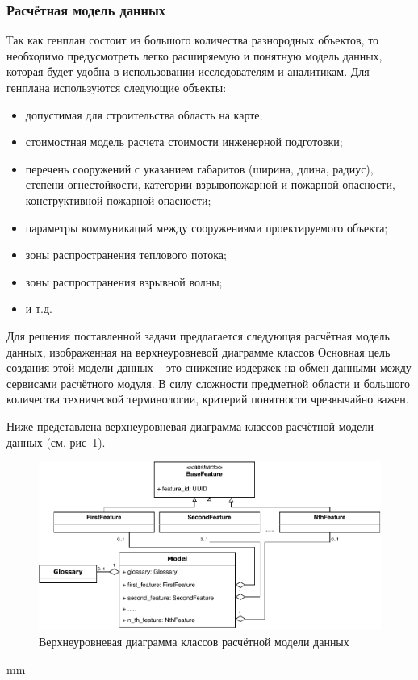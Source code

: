 \subsubsection{\large{Расчётная модель данных}}

Так как генплан состоит из большого количества разнородных объектов,
то необходимо предусмотреть легко расширяемую и понятную модель данных,
которая будет удобна в использовании исследователям и аналитикам.
Для генплана используются следующие объекты:
\begin{itemize}
    \item допустимая для строительства область на карте;
    \item стоимостная модель расчета стоимости инженерной подготовки;
    \item перечень сооружений с указанием габаритов (ширина, длина, радиус),
    степени огнестойкости, категории взрывопожарной и пожарной опасности, конструктивной пожарной опасности;
    \item параметры коммуникаций между сооружениями проектируемого объекта;
    \item зоны распространения теплового потока;
    \item зоны распространения взрывной волны;
	\item и т.д.
\end{itemize}

Для решения поставленной задачи предлагается следующая расчётная модель данных, изображенная
на верхнеуровневой диаграмме классов
Основная цель создания этой модели данных -- это снижение издержек на обмен данными между
сервисами расчётного модуля.
В силу сложности предметной области и большого количества технической терминологии,
критерий понятности чрезвычайно важен.

Ниже представлена верхнеуровневая диаграмма классов расчётной модели данных
(см. рис\ \ref{pic:architecture__model-classes}).

\begin{figure}[H]
	\includegraphics[width=\textwidth, left]{architecture/pictures/model/classes}
	\caption{Верхнеуровневая диаграмма классов расчётной модели данных}
	\label{pic:architecture__model-classes}
\end{figure}
 mm

